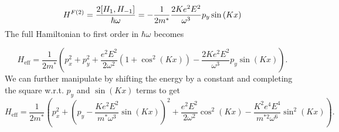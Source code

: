 \begin{equation}
  H^{F(2)} = \dfrac{2[H_{1}, H_{-1}]}{\hbar \omega} = -\dfrac{1}{2m^*} \dfrac{2 K e^2 E^2}{\omega^3} p_y \sin{(Kx)} \\
\end{equation}
The full Hamiltonian to first order in $\hbar \omega$ becomes

\begin{equation}
  H_{\text{eff}} = \dfrac{1}{2m^*} \left( p_x^2 + p_y^2 + \dfrac{e^2 E^2}{2 \omega^2} (1+\cos^2{(Kx)}) - \dfrac{2 K e^2 E^2}{\omega^3} p_y \sin{(Kx)} \right).
\end{equation}
We can further manipulate by shifting the energy by a constant and completing the square w.r.t. $p_y$ and $\sin{(Kx)}$ terms to get
\begin{equation}
  H_{\text{eff}} = \dfrac{1}{2m^*} \left( p_x^2 + \left(p_y - \dfrac{ K e^2 E^2}{m^*\omega^3} \sin{(Kx)}\right)^2 + \dfrac{e^2 E^2}{2 \omega^2} \cos^2{(Kx)} - \dfrac{K^2 e^4 E^4}{m^{*2}\omega^6} \sin^2{(Kx)} \right).
\end{equation}
